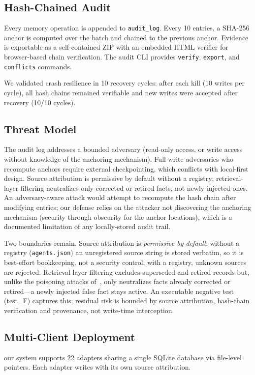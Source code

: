 \documentclass{llncs}
\begin{document}
\subsection{Hash-Chained Audit}
Every memory operation is appended to \texttt{audit\_log}. Every 10 entries, a SHA-256 anchor is computed over the batch and chained to the previous anchor. Evidence is exportable as a self-contained ZIP with an embedded HTML verifier for browser-based chain verification. The audit CLI provides \texttt{verify}, \texttt{export}, and \texttt{conflicts} commands.


We validated crash resilience in 10 recovery cycles: after each kill (10 writes per cycle), all hash chains remained verifiable and new writes were accepted after recovery (10/10 cycles).

\subsection{Threat Model}

The audit log addresses a bounded adversary (read-only access, or write access without knowledge of the anchoring mechanism). Full-write adversaries who recompute anchors require external checkpointing, which conflicts with local-first design. Source attribution is permissive by default without a registry; retrieval-layer filtering neutralizes only corrected or retired facts, not newly injected ones. An adversary-aware attack would attempt to recompute the hash chain after modifying entries; our defense relies on the attacker not discovering the anchoring mechanism (security through obscurity for the anchor locations), which is a documented limitation of any locally-stored audit trail.

Two boundaries remain. Source attribution is \emph{permissive by default}: without a registry (\texttt{agents.json}) an unregistered source string is stored verbatim, so it is best-effort bookkeeping, not a security control; with a registry, unknown sources are rejected. Retrieval-layer filtering excludes superseded and retired records but, unlike the poisoning attacks of~\cite{sleeper,agentpoison}, only neutralizes facts already corrected or retired---a newly injected false fact stays active. An executable negative test (test\_F) captures this; residual risk is bounded by source attribution, hash-chain verification and provenance, not write-time interception.

\subsection{Multi-Client Deployment}
our system supports 22 adapters sharing a single SQLite database via file-level pointers. Each adapter writes with its own source attribution.
\end{document}
